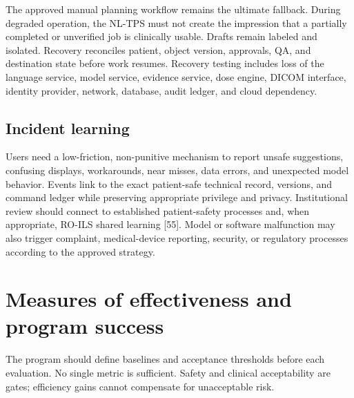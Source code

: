 \documentclass[11pt,letterpaper]{article}
\begin{document}
The approved manual planning workflow remains the ultimate fallback. During degraded operation, the NL-TPS must not create the impression that a partially completed or unverified job is clinically usable. Drafts remain labeled and isolated. Recovery reconciles patient, object version, approvals, QA, and destination state before work resumes. Recovery testing includes loss of the language service, model service, evidence service, dose engine, DICOM interface, identity provider, network, database, audit ledger, and cloud dependency.

\subsection{Incident learning}

Users need a low-friction, non-punitive mechanism to report unsafe suggestions, confusing displays, workarounds, near misses, data errors, and unexpected model behavior. Events link to the exact patient-safe technical record, versions, and command ledger while preserving appropriate privilege and privacy. Institutional review should connect to established patient-safety processes and, when appropriate, RO-ILS shared learning [55]. Model or software malfunction may also trigger complaint, medical-device reporting, security, or regulatory processes according to the approved strategy.

\section{Measures of effectiveness and program success}

The program should define baselines and acceptance thresholds before each evaluation. No single metric is sufficient. Safety and clinical acceptability are gates; efficiency gains cannot compensate for unacceptable risk.
\end{document}
